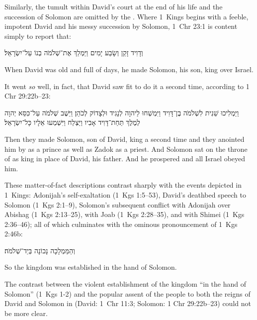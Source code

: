 Similarly, the tumult within David's court at the end of his life and the succession of Solomon are omitted by the \chronicler. Where 1~Kings begins with a feeble, impotent David and his messy succession by Solomon, 1~Chr 23:1 is content simply to report that:
\begin{hebrewtext}
    וְדָוִיד זָקֵן וְשָׂבַע יָמִים וַיַּמְלֵךְ אֶת־שְׁלֹמֹה בְנוֹ עַל־יִשְׂרָאֵל׃
\end{hebrewtext}
\begin{translation}
    When David was old and full of days, he made Solomon, his son, king over Israel.
\end{translation}
\noindent
It went \emph{so} well, in fact, that David saw fit to do it a second time, according to 1 Chr 29:22b--23:
\begin{hebrewtext}
    וַיַּמְלִיכוּ שֵׁנִית לִשְׁלֹמֹה בֶן־דָּוִיד וַיִּמְשְׁחוּ לַיהוָה לְנָגִיד וּלְצָדוֹק לְכֹהֵן׃ 
    וַיֵּשֶׁב שְׁלֹמֹה עַל־כִּסֵּא יְהוָה לְמֶלֶךְ תַּחַת־דָּוִיד אָבִיו וַיַּצְלַח וַיִּשְׁמְעוּ אֵלָיו כָּל־יִשְׂרָאֵל׃
\end{hebrewtext}
\begin{translation}
    Then they made Solomon, son of David, king a second time and they anointed him by \yahweh as a prince as well as Zadok as a priest.
    And Solomon sat on the throne of \yahweh as king in place of David, his father. And he prospered and all Israel obeyed him.
\end{translation}
\noindent
These matter-of-fact descriptions contrast sharply with the events depicted in 1~Kings: Adonijah's self-exaltation (1~Kgs 1:5--53), David's deathbed speech to Solomon (1~Kgs 2:1--9), Solomon's subsequent conflict with Adonijah over Abishag (1~Kgs 2:13--25), with Joab (1~Kgs 2:28--35), and with Shimei (1~Kgs 2:36--46); all of which culminates with the ominous pronouncement of 1~Kgs 2:46b:
\begin{hebrewtext}
    וְהַמַּמְלָכָה נָכוֹנָה בְּיַד־שְׁלֹמֹה׃
\end{hebrewtext}
\begin{translation}
    So the kingdom was established in the hand of Solomon.
\end{translation}
\noindent
The contrast between the violent establishment of the kingdom ``in the hand of Solomon'' (1~Kgs 1-2) and the popular assent of the people to both the reigns of David and Solomon in \chronicles (David: 1~Chr 11:3; Solomon: 1 Chr 29:22b--23) could not be more clear. 

